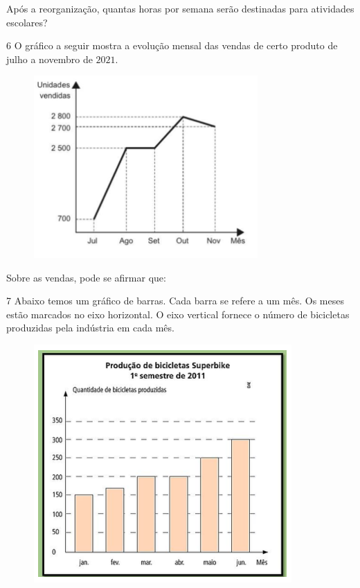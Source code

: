 Após a reorganização, quantas horas por semana serão destinadas para
atividades escolares?


\num{6}  O gráfico a seguir mostra a evolução mensal das vendas de certo
produto de julho a novembro de $2021$.

\begin{figure}
\includegraphics[width=3.36458in,height=2.73558in]{./imgSAEB_6_MAT/media/image84.png}
\end{figure}

Sobre as vendas, pode se afirmar que:


\num{7}  Abaixo temos um gráfico de barras. Cada barra se refere a um mês. Os
meses estão marcados no eixo horizontal. O eixo vertical fornece o
número de bicicletas produzidas pela indústria em cada mês.

\begin{figure}
\includegraphics[width=3.875in,height=3.57292in]{./imgSAEB_6_MAT/media/image85.png}
\end{figure}

